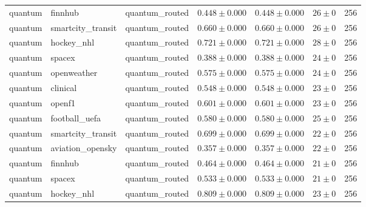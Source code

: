 \begin{table}[htbp]
\begin{tabular}{l l l r r r r}
quantum & finnhub & quantum\_routed & $0.448\pm0.000$ & $0.448\pm0.000$ & $26\pm0$ & 256 \\
quantum & smartcity\_transit & quantum\_routed & $0.660\pm0.000$ & $0.660\pm0.000$ & $26\pm0$ & 256 \\
quantum & hockey\_nhl & quantum\_routed & $0.721\pm0.000$ & $0.721\pm0.000$ & $28\pm0$ & 256 \\
quantum & spacex & quantum\_routed & $0.388\pm0.000$ & $0.388\pm0.000$ & $24\pm0$ & 256 \\
quantum & openweather & quantum\_routed & $0.575\pm0.000$ & $0.575\pm0.000$ & $24\pm0$ & 256 \\
quantum & clinical & quantum\_routed & $0.548\pm0.000$ & $0.548\pm0.000$ & $23\pm0$ & 256 \\
quantum & openf1 & quantum\_routed & $0.601\pm0.000$ & $0.601\pm0.000$ & $23\pm0$ & 256 \\
quantum & football\_uefa & quantum\_routed & $0.580\pm0.000$ & $0.580\pm0.000$ & $25\pm0$ & 256 \\
quantum & smartcity\_transit & quantum\_routed & $0.699\pm0.000$ & $0.699\pm0.000$ & $22\pm0$ & 256 \\
quantum & aviation\_opensky & quantum\_routed & $0.357\pm0.000$ & $0.357\pm0.000$ & $22\pm0$ & 256 \\
quantum & finnhub & quantum\_routed & $0.464\pm0.000$ & $0.464\pm0.000$ & $21\pm0$ & 256 \\
quantum & spacex & quantum\_routed & $0.533\pm0.000$ & $0.533\pm0.000$ & $21\pm0$ & 256 \\
quantum & hockey\_nhl & quantum\_routed & $0.809\pm0.000$ & $0.809\pm0.000$ & $23\pm0$ & 256 \\
\hline
\end{tabular}
\end{table}
